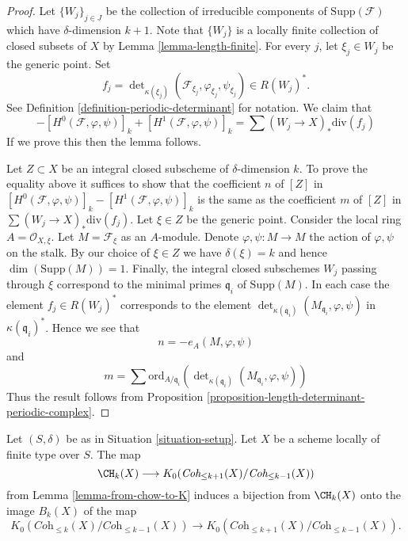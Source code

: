 \begin{proof}
Let $\{W_j\}_{j \in J}$ be the collection of irreducible
components of $\text{Supp}(\mathcal{F})$
which have $\delta$-dimension $k + 1$. Note that $\{W_j\}$
is a locally finite collection of closed subsets of
$X$ by Lemma \ref{lemma-length-finite}.
For every $j$, let $\xi_j \in W_j$ be the generic point.
Set
$$
f_j = \det\nolimits_{\kappa(\xi_j)}
(\mathcal{F}_{\xi_j}, \varphi_{\xi_j}, \psi_{\xi_j})
\in
R(W_j)^*.
$$
See Definition \ref{definition-periodic-determinant} for notation.
We claim that
$$
- [H^0(\mathcal{F}, \varphi, \psi)]_k + [H^1(\mathcal{F}, \varphi, \psi)]_k
=
\sum (W_j \to X)_*\text{div}(f_j)
$$
If we prove this then the lemma follows.

\medskip\noindent
Let $Z \subset X$ be an integral closed subscheme of $\delta$-dimension $k$.
To prove the equality above it suffices to show that the coefficient $n$
of $[Z]$ in
$
[H^0(\mathcal{F}, \varphi, \psi)]_k - [H^1(\mathcal{F}, \varphi, \psi)]_k
$
is the same as the coefficient $m$ of $[Z]$ in
$
\sum (W_j \to X)_*\text{div}(f_j)
$.
Let $\xi \in Z$ be the generic point.
Consider the local ring $A = \mathcal{O}_{X, \xi}$.
Let $M = \mathcal{F}_\xi$ as an $A$-module.
Denote $\varphi, \psi : M \to M$ the action of $\varphi, \psi$ on
the stalk.
By our choice of $\xi \in Z$ we have $\delta(\xi) = k$
and hence $\dim(\text{Supp}(M)) = 1$.
Finally, the integral closed subschemes
$W_j$ passing through $\xi$ correspond to the minimal primes
$\mathfrak q_i$ of $\text{Supp}(M)$.
In each case the element $f_j \in R(W_j)^*$ corresponds to
the element $\det_{\kappa(\mathfrak q_i)}(M_{\mathfrak q_i}, \varphi, \psi)$
in $\kappa(\mathfrak q_i)^*$. Hence we see that
$$
n = - e_A(M, \varphi, \psi)
$$
and
$$
m =
\sum
\text{ord}_{A/\mathfrak q_i}
(\det\nolimits_{\kappa(\mathfrak q_i)}(M_{\mathfrak q_i}, \varphi, \psi))
$$
Thus the result follows from
Proposition \ref{proposition-length-determinant-periodic-complex}.
\end{proof}

\begin{lemma}
\label{lemma-cycles-rational-equivalence-K-group}
Let $(S, \delta)$ be as in Situation \ref{situation-setup}.
Let $X$ be a scheme locally of finite type over $S$.
The map
$$
\CH_k(X) \longrightarrow
K_0(\textit{Coh}_{\leq k + 1}(X)/\textit{Coh}_{\leq k - 1}(X))
$$
from Lemma \ref{lemma-from-chow-to-K} induces a bijection from
$\CH_k(X)$ onto the image $B_k(X)$ of the map
$$
K_0(\textit{Coh}_{\leq k}(X)/\textit{Coh}_{\leq k - 1}(X))
\longrightarrow
K_0(\textit{Coh}_{\leq k + 1}(X)/\textit{Coh}_{\leq k - 1}(X)).
$$
\end{lemma}


